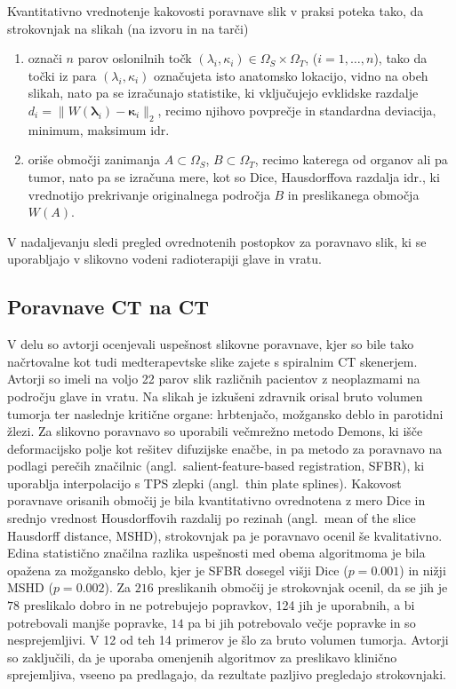 \documentclass[journal]{IEEEtran}
\begin{document}
Kvantitativno vrednotenje kakovosti poravnave slik v praksi poteka tako, da strokovnjak na slikah (na izvoru in na tarči)
\begin{enumerate}
\item označi $n$ parov oslonilnih točk $(\lambda_i,\kappa_i)\in\Omega_S\times\Omega_T$, ($i=1,\dots,n$), tako da točki iz para $(\lambda_i, \kappa_i)$ označujeta isto anatomsko lokacijo, vidno na obeh slikah, nato pa se izračunajo statistike, ki vključujejo evklidske razdalje $d_i=\|W(\boldsymbol{\lambda}_i)-\boldsymbol{\kappa}_i\|_2$, recimo njihovo povprečje in standardna deviacija, minimum, maksimum idr.
\item oriše območji zanimanja $A\subset\Omega_S$, $B\subset\Omega_T$, recimo katerega od organov ali pa tumor, nato pa se izračuna mere, kot so Dice, Hausdorffova razdalja idr., ki vrednotijo prekrivanje originalnega področja $B$ in preslikanega območja $W(A)$.
\end{enumerate}

V nadaljevanju sledi pregled ovrednotenih postopkov za poravnavo slik, ki se uporabljajo v slikovno vodeni radioterapiji glave in vratu.

\subsection{Poravnave CT na CT}

V delu \cite{hardcastle2012} so avtorji ocenjevali uspešnost slikovne poravnave, kjer so bile tako načrtovalne kot tudi medterapevtske slike zajete s spiralnim CT skenerjem. Avtorji so imeli na voljo 22 parov slik različnih pacientov z neoplazmami na področju glave in vratu. Na slikah je izkušeni zdravnik orisal bruto volumen tumorja ter naslednje kritične organe: hrbtenjačo, možgansko deblo in parotidni žlezi. Za slikovno poravnavo so uporabili večmrežno metodo Demons\cite{vercauteren2009}, ki išče deformacijsko polje kot rešitev difuzijske enačbe, in pa metodo za poravnavo na podlagi perečih značilnic (angl.~salient-feature-based registration, SFBR), ki uporablja interpolacijo s TPS zlepki (angl.~thin plate splines). Kakovost poravnave orisanih območij je bila kvantitativno ovrednotena z mero Dice in srednjo vrednost Housdorffovih razdalij po rezinah (angl.~mean of the slice Hausdorff distance, MSHD), strokovnjak pa je poravnavo ocenil še kvalitativno. Edina statistično značilna razlika uspešnosti med obema algoritmoma je bila opažena za možgansko deblo, kjer je SFBR dosegel višji Dice ($p=0.001$) in nižji MSHD ($p=0.002$). Za $216$ preslikanih območij je strokovnjak ocenil, da se jih je $78$ preslikalo dobro in ne potrebujejo popravkov, 124 jih je uporabnih, a bi potrebovali manjše popravke, $14$ pa bi jih potrebovalo večje popravke in so nesprejemljivi. V 12 od teh 14 primerov je šlo za bruto volumen tumorja. Avtorji so zaključili, da je uporaba omenjenih algoritmov za preslikavo klinično sprejemljiva, vseeno pa predlagajo, da rezultate pazljivo pregledajo strokovnjaki.
\end{document}
